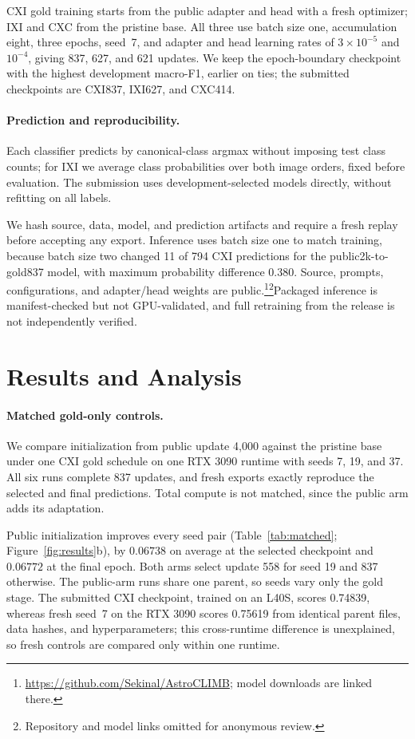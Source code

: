 CXI gold training starts from the public adapter and head with a fresh optimizer; IXI and CXC from the pristine base. All three use batch size one, accumulation eight, three epochs, seed~7, and adapter and head learning rates of $3\!\times\!10^{-5}$ and $10^{-4}$, giving 837, 627, and 621 updates. We keep the epoch-boundary checkpoint with the highest development macro-F1, earlier on ties; the submitted checkpoints are CXI837, IXI627, and CXC414.

\paragraph{Prediction and reproducibility.}
Each classifier predicts by canonical-class argmax without imposing test class counts; for IXI we average class probabilities over both image orders, fixed before evaluation. The submission uses development-selected models directly, without refitting on all labels.

We hash source, data, model, and prediction artifacts and require a fresh replay before accepting any export. Inference uses batch size one to match training, because batch size two changed 11 of 794 CXI predictions for the public2k-to-gold837 model, with maximum probability difference 0.380. Source, prompts, configurations, and adapter/head weights are public.\ifdefined\CameraReady\footnote{\url{https://github.com/Sekinal/AstroCLIMB}; model downloads are linked there.}\else\footnote{Repository and model links omitted for anonymous review.}\fi Packaged inference is manifest-checked but not GPU-validated, and full retraining from the release is not independently verified.

\section{Results and Analysis}

\paragraph{Matched gold-only controls.}
We compare initialization from public update 4,000 against the pristine base under one CXI gold schedule on one RTX 3090 runtime with seeds 7, 19, and 37. All six runs complete 837 updates, and fresh exports exactly reproduce the selected and final predictions. Total compute is not matched, since the public arm adds its adaptation.

Public initialization improves every seed pair (Table~\ref{tab:matched}; Figure~\ref{fig:results}b), by $0.06738$ on average at the selected checkpoint and $0.06772$ at the final epoch. Both arms select update 558 for seed 19 and 837 otherwise. The public-arm runs share one parent, so seeds vary only the gold stage. The submitted CXI checkpoint, trained on an L40S, scores 0.74839, whereas fresh seed~7 on the RTX 3090 scores 0.75619 from identical parent files, data hashes, and hyperparameters; this cross-runtime difference is unexplained, so fresh controls are compared only within one runtime.

